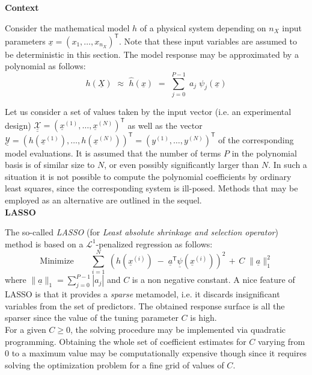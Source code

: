 {\textbf{Context} \vspace{2mm}

Consider the mathematical model $h$ of a physical system depending on $n_X$ input parameters $\underline{x} = (x_{1},\dots,x_{n_X})^{\textsf{T}}$. Note that these input variables are assumed to be deterministic in this section. The model response may be approximated by a polynomial as follows:
\begin{equation} \label{eq:5-2.1}
	h(\underline{X}) \, \, \approx \, \, \widehat{h}(\underline{x}) \, \, = \, \, \sum_{j=0}^{P-1} \; a_{j} \; \psi_{j}(\underline{x})
\end{equation}

Let us consider a set of values taken by the input vector (i.e. an experimental design) $\underline{\underline{\mathcal{X}}} = (\underline{x}^{(1)},\dots,\underline{x}^{(N)})^{\textsf{T}}$ as well as the vector $\underline{\mathcal{Y}} = (h(\underline{x}^{(1)}),\dots,h(\underline{x}^{(N)}))^{\textsf{T}} =  (y^{(1)},\dots,y^{(N)})^{\textsf{T}}$ of the corresponding model evaluations. It is assumed that the number of terms $P$ in the polynomial basis is of similar size to $N$, or even possibly significantly larger than $N$. In such a situation it is not possible to compute the polynomial coefficients by ordinary least squares, since the corresponding system is ill-posed. Methods that may be employed as an alternative are outlined in the sequel.  \\

\textbf{LASSO} \vspace{2mm}

The so-called \emph{LASSO} (for \emph{Least absolute shrinkage and selection operator}) method is based on a $\mathcal{L}^{1}$-penalized regression as follows:
\begin{equation} \label{eq:5-2.5}
		\textrm{Minimize} \quad \quad \sum_{i=1}^{N} \; \left( h(\underline{x}^{(i)}) \; - \; \underline{a}^{\textsf{T}} \underline{\psi}(\underline{x}^{(i)})  \right)^{2}
\, + \,  C \; \|\underline{a}\|_{1}^{2}
\end{equation} 
where $\|\underline{a}\|_{1} = \sum_{j=0}^{P-1} |a_{j}|$ and $C$ is a non negative constant. A nice feature of LASSO is that it provides a \emph{sparse} metamodel, i.e. it discards insignificant variables from the set of predictors. The obtained response surface is all the sparser since the value of the tuning parameter $C$ is high. \\

For a given $C\geq 0$, the solving procedure may be implemented via quadratic programming. Obtaining the whole set of coefficient estimates for $C$ varying from 0 to a maximum value may be computationally expensive though since it requires solving the optimization problem for a fine grid of values of $C$.  \\

}
